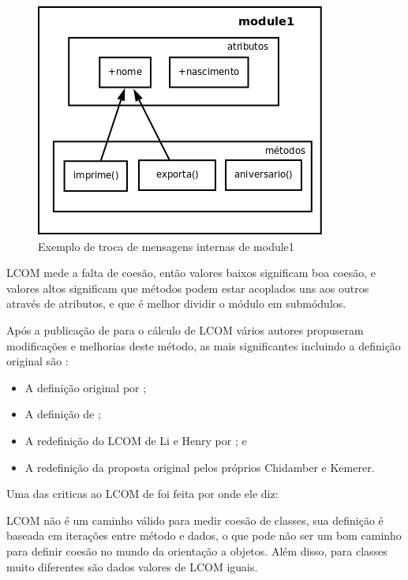 \begin{figure}[h]
\center
\includegraphics[scale=0.4]{imagens/exemplo-lcom}
\caption{Exemplo de troca de mensagens internas de module1}
\label{fig:exemplo-lcom}
\end{figure}

LCOM mede a falta de coesão, então valores baixos significam boa coesão, e
valores altos significam que métodos podem estar acoplados uns aos outros
através de atributos, e que é melhor dividir o módulo em
submódulos\cite{observationsOnLCOM}.

Após a publicação de  para o cálculo de LCOM
vários autores propuseram modificações e melhorias deste método, as mais
significantes incluindo a definição original são
\cite{principalComponentAnalysisOfLCOM}:

\begin{itemize}
\item A definição original por ;
\item A definição de ;
\item A redefinição do LCOM de Li e Henry por ; e
\item A redefinição da proposta original pelos próprios Chidamber e Kemerer.
\end{itemize}

Uma das criticas ao LCOM de  foi feita por
 onde ele diz:

\begin{citacao}
LCOM não é um caminho válido para medir coesão de classes, sua definição é
baseada em iterações entre método e dados, o que pode não ser um bom caminho
para definir coesão no mundo da orientação a objetos. Além disso, para classes
muito diferentes são dados valores de LCOM iguais. \cite{aCritiqueOfCohesion}
\end{citacao}

